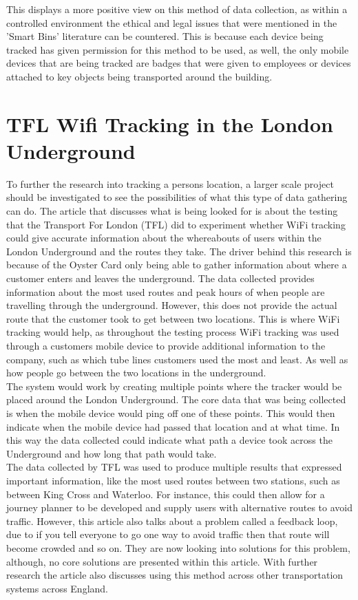 \documentclass{report}
\begin{document}
This displays a more positive view on this method of data collection, as within a controlled environment the ethical and legal issues that were mentioned in the 'Smart Bins' literature can be countered. This is because each device being tracked has given permission for this method to be used, as well, the only mobile devices that are being tracked are badges that were given to employees or devices attached to key objects being transported around the building. \\ \newline   
\newpage
\section{TFL Wifi Tracking in the London Underground}
To further the research into tracking a persons location, a larger scale project should be investigated to see the possibilities of what this type of data gathering can do. The article that discusses what is being looked for is about the testing that the Transport For London (TFL) did to experiment whether WiFi tracking could give accurate information about the whereabouts of users within the London Underground and the routes they take\cite{GizmodoLondon}. The driver behind this research is because of the Oyster Card only being able to gather information about where a customer enters and leaves the underground. The data collected provides information about the most used routes and peak hours of when people are travelling through the underground. However, this does not provide the actual route that the customer took to get between two locations. This is where WiFi tracking would help, as throughout the testing process WiFi tracking was used through a customers mobile device to provide additional information to the company, such as which tube lines customers used the most and least. As well as how people go between the two locations in the underground. \\ \newline
The system would work by creating multiple points where the tracker would be placed around the London Underground. The core data that was being collected is when the mobile device would ping off one of these points. This would then indicate when the mobile device had passed that location and at what time. In this way the data collected could indicate what path a device took across the Underground and how long that path would take. \\ \newline
The data collected by TFL was used to produce multiple results that expressed important information, like the most used routes between two stations, such as between King Cross and Waterloo. For instance, this could then allow for a journey planner to be developed and supply users with alternative routes to avoid traffic. However, this article also talks about a problem called a feedback loop, due to if you tell everyone to go one way to avoid traffic then that route will become crowded and so on. They are now looking into solutions for this problem, although, no core solutions are presented within this article. With further research the article also discusses using this method across other transportation systems across England. \\ \newline
\end{document}
